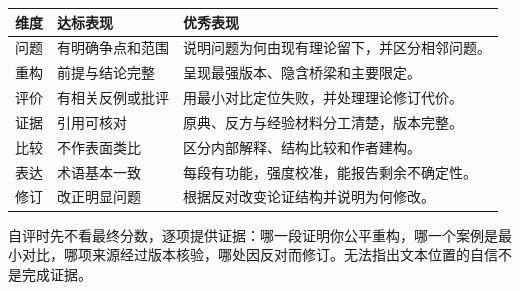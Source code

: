\begin{longtable}{p{}p{}p{}}
\toprule
维度 & 达标表现 & 优秀表现\\\midrule\endhead
问题 & 有明确争点和范围 & 说明问题为何由现有理论留下，并区分相邻问题。\\
重构 & 前提与结论完整 & 呈现最强版本、隐含桥梁和主要限定。\\
评价 & 有相关反例或批评 & 用最小对比定位失败，并处理理论修订代价。\\
证据 & 引用可核对 & 原典、反方与经验材料分工清楚，版本完整。\\
比较 & 不作表面类比 & 区分内部解释、结构比较和作者建构。\\
表达 & 术语基本一致 & 每段有功能，强度校准，能报告剩余不确定性。\\
修订 & 改正明显问题 & 根据反对改变论证结构并说明为何修改。\\
\bottomrule
\end{longtable}

自评时先不看最终分数，逐项提供证据：哪一段证明你公平重构，哪一个案例是最小对比，哪项来源经过版本核验，哪处因反对而修订。无法指出文本位置的自信不是完成证据。
